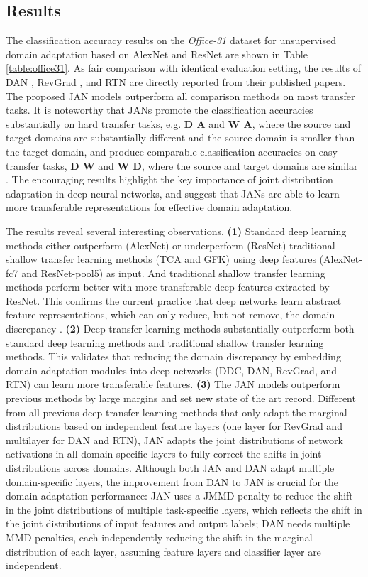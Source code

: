 \documentclass{article}
\begin{document}
\subsection{Results}
The classification accuracy results on the \textit{Office-31} dataset for unsupervised domain adaptation based on AlexNet and ResNet are shown in Table \ref{table:office31}. As fair comparison with identical evaluation setting, the results of DAN \cite{cite:ICML15DAN}, RevGrad \cite{cite:ICML15RevGrad}, and RTN \cite{cite:NIPS16RTN} are directly reported from their published papers. The proposed JAN models outperform all comparison methods on most transfer tasks. It is noteworthy that JANs promote the classification accuracies substantially on hard transfer tasks, e.g. \textbf{D  A} and \textbf{W  A}, where the source and target domains are substantially different and the source domain is smaller than the target domain, and produce comparable classification accuracies on easy transfer tasks, \textbf{D  W} and \textbf{W  D}, where the source and target domains are similar \cite{cite:ECCV10Office}. The encouraging results highlight the key importance of joint distribution adaptation in deep neural networks, and suggest that JANs are able to learn more transferable representations for effective domain adaptation.

The results reveal several interesting observations. \textbf{(1)} Standard deep learning methods either outperform (AlexNet) or underperform (ResNet) traditional shallow transfer learning methods (TCA and GFK) using deep features (AlexNet-fc7 and ResNet-pool5) as input. And traditional shallow transfer learning methods perform better with more transferable deep features extracted by ResNet. This confirms the current practice that deep networks learn abstract feature representations, which can only reduce, but not remove, the domain discrepancy \cite{cite:NIPS14CNN}. \textbf{(2)} Deep transfer learning methods substantially outperform both standard deep learning methods and traditional shallow transfer learning methods. This validates that reducing the domain discrepancy by embedding domain-adaptation modules into deep networks (DDC, DAN, RevGrad, and RTN) can learn more transferable features. \textbf{(3)} The JAN models outperform previous methods by large margins and set new state of the art record. Different from all previous deep transfer learning methods that only adapt the marginal distributions based on independent feature layers (one layer for RevGrad and multilayer for DAN and RTN), JAN adapts the joint distributions of network activations in all domain-specific layers to fully correct the shifts in joint distributions across domains. Although both JAN and DAN \cite{cite:ICML15DAN} adapt multiple domain-specific layers, the improvement from DAN to JAN is crucial for the domain adaptation performance: JAN uses a JMMD penalty to reduce the shift in the joint distributions of multiple task-specific layers, which reflects the shift in the joint distributions of input features and output labels; DAN needs multiple MMD penalties, each independently reducing the shift in the marginal distribution of each layer, assuming feature layers and classifier layer are independent.
\end{document}
